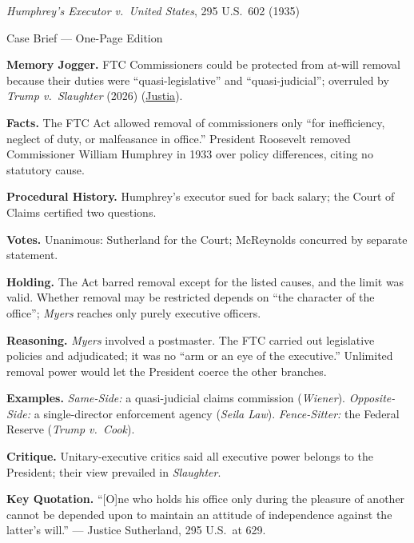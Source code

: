 \documentclass[12pt]{article}
\begin{document}
\begin{center}
{\Large \textit{Humphrey's Executor v.\ United States}, 295 U.S.\ 602 (1935)\par}
\vspace{0.3em}
{\normalsize Case Brief --- One-Page Edition\par}
\end{center}

\textbf{Memory Jogger.} FTC Commissioners could be protected from at-will removal because their duties were ``quasi-legislative'' and ``quasi-judicial''; overruled by \textit{Trump v.\ Slaughter} (2026) (\href{https://supreme.justia.com/cases/federal/us/295/602/}{Justia}).

\textbf{Facts.} The FTC Act allowed removal of commissioners only ``for inefficiency, neglect of duty, or malfeasance in office.'' President Roosevelt removed Commissioner William Humphrey in 1933 over policy differences, citing no statutory cause.

\textbf{Procedural History.} Humphrey's executor sued for back salary; the Court of Claims certified two questions.

\textbf{Votes.} Unanimous: Sutherland for the Court; McReynolds concurred by separate statement.

\textbf{Holding.} The Act barred removal except for the listed causes, and the limit was valid. Whether removal may be restricted depends on ``the character of the office''; \textit{Myers} reaches only purely executive officers.

\textbf{Reasoning.} \textit{Myers} involved a postmaster. The FTC carried out legislative policies and adjudicated; it was no ``arm or an eye of the executive.'' Unlimited removal power would let the President coerce the other branches.

\textbf{Examples.} \emph{Same-Side:} a quasi-judicial claims commission (\textit{Wiener}). \emph{Opposite-Side:} a single-director enforcement agency (\textit{Seila Law}). \emph{Fence-Sitter:} the Federal Reserve (\textit{Trump v.\ Cook}).

\textbf{Critique.} Unitary-executive critics said all executive power belongs to the President; their view prevailed in \textit{Slaughter}.

\textbf{Key Quotation.} ``[O]ne who holds his office only during the pleasure of another cannot be depended upon to maintain an attitude of independence against the latter's will.'' --- Justice Sutherland, 295 U.S.\ at 629.
\end{document}
